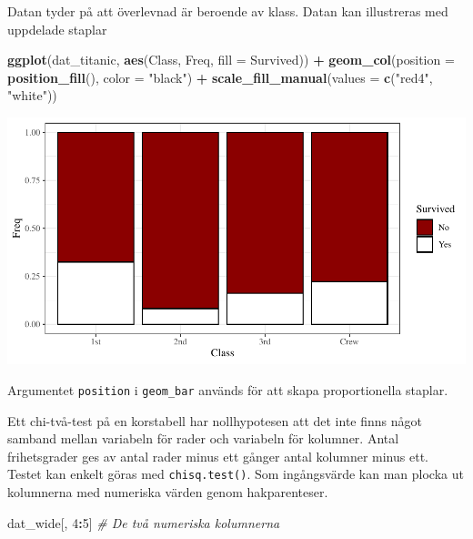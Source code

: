 \documentclass[
]{book}
\newenvironment{Shaded}{\begin{snugshade}}{\end{snugshade}}
\newcommand{\AttributeTok}[1]{\textcolor[rgb]{0.13,0.29,0.53}{#1}}
\newcommand{\CommentTok}[1]{\textcolor[rgb]{0.56,0.35,0.01}{\textit{#1}}}
\newcommand{\DecValTok}[1]{\textcolor[rgb]{0.00,0.00,0.81}{#1}}
\newcommand{\FunctionTok}[1]{\textcolor[rgb]{0.13,0.29,0.53}{\textbf{#1}}}
\newcommand{\NormalTok}[1]{#1}
\newcommand{\SpecialCharTok}[1]{\textcolor[rgb]{0.81,0.36,0.00}{\textbf{#1}}}
\newcommand{\StringTok}[1]{\textcolor[rgb]{0.31,0.60,0.02}{#1}}
\theoremstyle{definition}
\theoremstyle{definition}
\theoremstyle{definition}
\theoremstyle{definition}
\theoremstyle{remark}
\begin{document}
Datan tyder på att överlevnad är beroende av klass. Datan kan illustreras med uppdelade staplar

\begin{Shaded}
\begin{Highlighting}[]
\FunctionTok{ggplot}\NormalTok{(dat\_titanic, }\FunctionTok{aes}\NormalTok{(Class, Freq, }\AttributeTok{fill =}\NormalTok{ Survived)) }\SpecialCharTok{+}
  \FunctionTok{geom\_col}\NormalTok{(}\AttributeTok{position =} \FunctionTok{position\_fill}\NormalTok{(), }\AttributeTok{color =} \StringTok{"black"}\NormalTok{) }\SpecialCharTok{+}
  \FunctionTok{scale\_fill\_manual}\NormalTok{(}\AttributeTok{values =} \FunctionTok{c}\NormalTok{(}\StringTok{"red4"}\NormalTok{, }\StringTok{"white"}\NormalTok{))}
\end{Highlighting}
\end{Shaded}

\begin{center}\includegraphics{R-anvisningar_files/figure-latex/unnamed-chunk-175-1} \end{center}

Argumentet \texttt{position} i \texttt{geom\_bar} används för att skapa proportionella staplar.

Ett chi-två-test på en korstabell har nollhypotesen att det inte finns något samband mellan variabeln för rader och variabeln för kolumner. Antal frihetsgrader ges av antal rader minus ett gånger antal kolumner minus ett. Testet kan enkelt göras med \texttt{chisq.test()}. Som ingångsvärde kan man plocka ut kolumnerna med numeriska värden genom hakparenteser.

\begin{Shaded}
\begin{Highlighting}[]
\NormalTok{dat\_wide[, }\DecValTok{4}\SpecialCharTok{:}\DecValTok{5}\NormalTok{] }\CommentTok{\# De två numeriska kolumnerna}
\end{Highlighting}
\end{Shaded}
\end{document}
